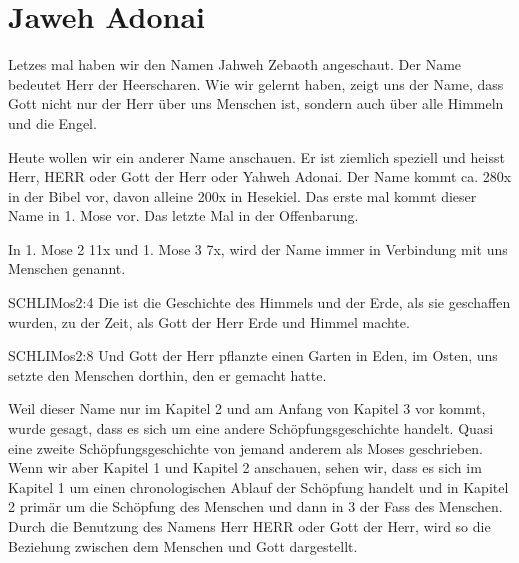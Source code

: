 \section{Jaweh Adonai}
\begin{otsblock}
        Letzes mal haben wir den Namen Jahweh Zebaoth angeschaut. Der Name bedeutet Herr der Heerscharen. Wie wir gelernt haben, zeigt uns der Name, dass Gott nicht nur der Herr über uns Menschen ist, sondern auch über alle Himmeln und die Engel.

        Heute wollen wir ein anderer Name anschauen. Er ist ziemlich speziell und heisst Herr, HERR oder Gott der Herr oder Yahweh Adonai. Der Name kommt ca. 280x in der Bibel vor, davon alleine 200x in Hesekiel. Das erste mal kommt dieser Name in 1. Mose vor. Das letzte Mal in der Offenbarung.

        In 1. Mose 2 11x und 1. Mose 3 7x, wird der Name immer in Verbindung mit uns Menschen genannt.
        \begin{bibelbox}{SCHL}{IMos}{2:4}
            Die ist die Geschichte des Himmels und der Erde, als sie geschaffen wurden, zu der Zeit, als Gott der Herr Erde und Himmel machte.
        \end{bibelbox}
        \begin{bibelbox}{SCHL}{IMos}{2:8}
            Und Gott der Herr pflanzte einen Garten in Eden, im Osten, uns setzte den Menschen dorthin, den er gemacht hatte.
        \end{bibelbox}
        Weil dieser Name nur im Kapitel 2 und am Anfang von Kapitel 3 vor kommt, wurde gesagt, dass es sich um eine andere Schöpfungsgeschichte handelt. Quasi eine zweite Schöpfungsgeschichte von jemand anderem als Moses geschrieben. Wenn wir aber Kapitel 1 und Kapitel 2 anschauen, sehen wir, dass es sich im Kapitel 1 um einen chronologischen Ablauf der Schöpfung handelt und in Kapitel 2 primär um die Schöpfung des Menschen und dann in 3 der Fass des Menschen. Durch die Benutzung des Namens Herr HERR oder Gott der Herr, wird so die Beziehung zwischen dem Menschen und Gott dargestellt.


\end{otsblock}

